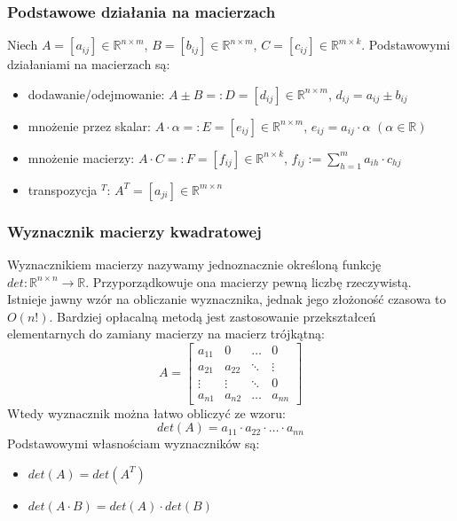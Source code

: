 \documentclass[a4paper,11pt]{article}
\begin{document}
\subsubsection{Podstawowe działania na macierzach}
Niech $A = \left[ a_{ij} \right] \in \mathbb{R}^{n\times m}$, $B = \left[ b_{ij} \right] \in \mathbb{R}^{n\times m}$, $C = \left[ c_{ij} \right] \in \mathbb{R}^{m\times k}$. Podstawowymi działaniami na macierzach są:
\begin{itemize}
\item dodawanie/odejmowanie: $A \pm B =: D = \left[ d_{ij} \right] \in \mathbb{R}^{n\times m}$, $d_{ij} = a_{ij} \pm b_{ij}$
\item mnożenie przez skalar: $A \cdot \alpha =: E = \left[ e_{ij} \right] \in \mathbb{R}^{n\times m}$, $e_{ij} = a_{ij} \cdot \alpha$ $(\alpha \in \mathbb{R})$
\item mnożenie macierzy: $A \cdot C =: F = \left[ f_{ij} \right] \in \mathbb{R}^{n\times k}$, $f_{ij} := \sum\limits_{h=1}^{m} a_{ih}\cdot c_{hj}$
\item transpozycja ${}^T$: $A^T =  \left[ a_{ji} \right] \in \mathbb{R}^{m \times n}$
\end{itemize}

\subsubsection{Wyznacznik macierzy kwadratowej}
Wyznacznikiem macierzy nazywamy jednoznacznie określoną funkcję $det: \mathbb{R}^{n\times n} \to \mathbb{R}$. Przyporządkowuje ona macierzy pewną liczbę rzeczywistą. Istnieje jawny wzór na obliczanie wyznacznika, jednak jego złożoność czasowa to $O(n!)$. Bardziej opłacalną metodą jest zastosowanie przekształceń elementarnych do zamiany macierzy na macierz trójkątną:
$$
A = \left[
\begin{array}{cccc}
a_{11}	& 	0		& 	\ldots 		& 0 \\
a_{21}	& 	a_{22}	& 	\ddots		& \vdots \\
\vdots 	& 	\vdots		& 	\ddots		& 0 \\
a_{n1}	& 	a_{n2}	& 	\ldots 		& a_{nn} 
\end{array}
\right]
$$
\noindent Wtedy wyznacznik można łatwo obliczyć ze wzoru:
$$ det(A) = a_{11} \cdot a_{22} \cdot \ldots \cdot a_{nn} $$
\noindent Podstawowymi własnościam wyznaczników są:
\begin{itemize}
\item $det(A) = det(A^T)$
\item $det(A\cdot B) = det(A) \cdot det(B)$
\end{itemize}
\end{document}
